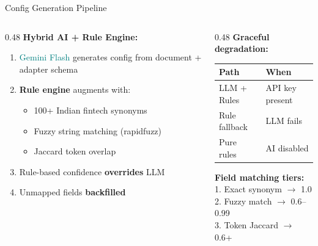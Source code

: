 \documentclass[aspectratio=169,11pt]{beamer}
\begin{document}
\begin{frame}{Config Generation Pipeline}
\begin{columns}[T]
\begin{column}{0.48\textwidth}
\textbf{Hybrid AI + Rule Engine:}
\begin{enumerate}
\item \textcolor{teal}{Gemini Flash} generates config from document + adapter schema
\item \textbf{Rule engine} augments with:
  \begin{itemize}
  \item 100+ Indian fintech synonyms
  \item Fuzzy string matching (rapidfuzz)
  \item Jaccard token overlap
  \end{itemize}
\item Rule-based confidence \textbf{overrides} LLM
\item Unmapped fields \textbf{backfilled}
\end{enumerate}
\end{column}
\begin{column}{0.48\textwidth}
\textbf{Graceful degradation:}\\[0.3em]
{\small
\begin{tabular}{ll}
\toprule
\textbf{Path} & \textbf{When} \\
\midrule
LLM + Rules & API key present \\
Rule fallback & LLM fails \\
Pure rules & AI disabled \\
\bottomrule
\end{tabular}
}

\vspace{0.5em}
\textbf{Field matching tiers:}\\[0.2em]
{\small
1. Exact synonym $\to$ \textcolor{ok}{1.0}\\
2. Fuzzy match $\to$ \textcolor{warn}{0.6--0.99}\\
3. Token Jaccard $\to$ \textcolor{warn}{0.6+}\\
}
\end{column}
\end{columns}
\end{frame}
\end{document}
